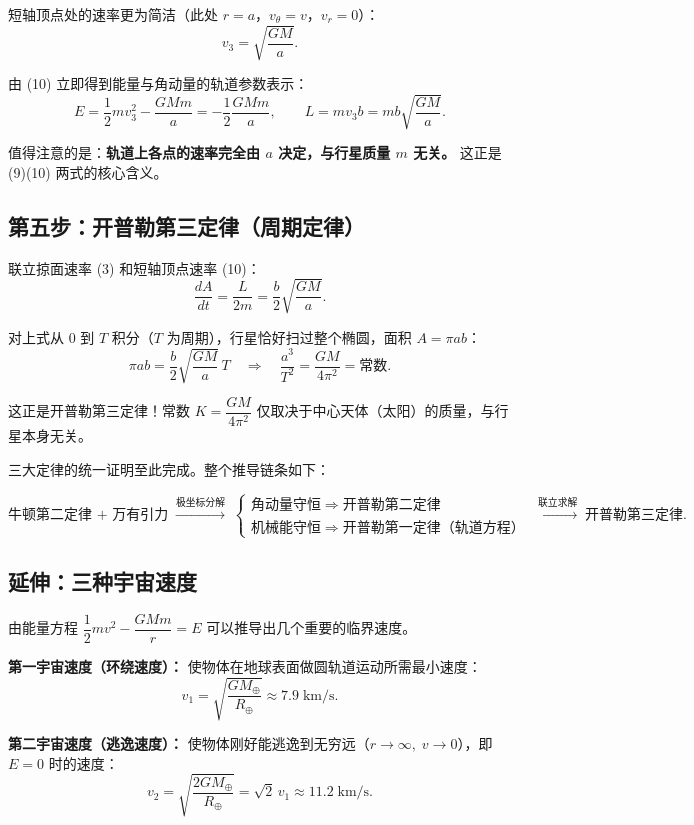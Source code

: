 \documentclass[12pt,a4paper]{article}
\begin{document}
短轴顶点处的速率更为简洁（此处 $r=a$，$v_\theta = v$，$v_r = 0$）：
\[
v_3 = \sqrt{\frac{GM}{a}}.
\tag{10}
\]

由 (10) 立即得到能量与角动量的轨道参数表示：
\[
E = \frac{1}{2}mv_3^2 - \frac{GMm}{a} = -\frac{1}{2}\frac{GMm}{a},
\qquad
L = m v_3 b = mb\sqrt{\frac{GM}{a}}.
\tag{11}
\]

值得注意的是：\textbf{轨道上各点的速率完全由 $a$ 决定，与行星质量 $m$ 无关。} 这正是 (9)(10) 两式的核心含义。

\subsection{第五步：开普勒第三定律（周期定律）}

联立掠面速率 (3) 和短轴顶点速率 (10)：
\[
\frac{dA}{dt} = \frac{L}{2m} = \frac{b}{2}\sqrt{\frac{GM}{a}}.
\tag{12}
\]

对上式从 $0$ 到 $T$ 积分（$T$ 为周期），行星恰好扫过整个椭圆，面积 $A = \pi ab$：
\[
\pi ab = \frac{b}{2}\sqrt{\frac{GM}{a}}\,T
\quad\Longrightarrow\quad
\boxed{\frac{a^3}{T^2} = \frac{GM}{4\pi^2} = \text{常数}}.
\tag{13}
\]

这正是开普勒第三定律！常数 $K = \dfrac{GM}{4\pi^2}$ 仅取决于中心天体（太阳）的质量，与行星本身无关。

三大定律的统一证明至此完成。整个推导链条如下：

\[
\text{牛顿第二定律 + 万有引力}
\;\xrightarrow{\text{极坐标分解}}\;
\begin{cases}
\text{角动量守恒} \;\Longrightarrow\; \text{开普勒第二定律} \\
\text{机械能守恒} \;\Longrightarrow\; \text{开普勒第一定律（轨道方程）}
\end{cases}
\;\xrightarrow{\text{联立求解}}\;
\text{开普勒第三定律}.
\]

\subsection{延伸：三种宇宙速度}

由能量方程 $\dfrac{1}{2}mv^2 - \dfrac{GMm}{r} = E$ 可以推导出几个重要的临界速度。

\textbf{第一宇宙速度（环绕速度）：} 使物体在地球表面做圆轨道运动所需最小速度：
\[
v_1 = \sqrt{\frac{GM_\oplus}{R_\oplus}} \approx 7.9\;\text{km/s}.
\]

\textbf{第二宇宙速度（逃逸速度）：} 使物体刚好能逃逸到无穷远（$r\to\infty,\;v\to 0$），即 $E=0$ 时的速度：
\[
v_2 = \sqrt{\frac{2GM_\oplus}{R_\oplus}} = \sqrt{2}\,v_1 \approx 11.2\;\text{km/s}.
\]
\end{document}
